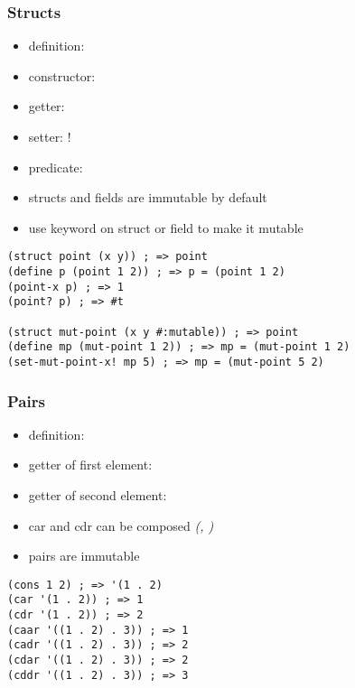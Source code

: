 \documentclass[a4paper,landscape,10pt]{article}
\begin{document}
\begin{multicols*}{2}
  \subsubsection{Structs}

  \begin{itemize}
    \item definition: 
    \item constructor: 
    \item getter: 
    \item setter: !
    \item predicate: 
    \item structs and fields are immutable by default
    \item use  keyword on struct or field to make it mutable
  \end{itemize}

  \begin{lstlisting}[language=Racket]
(struct point (x y)) ; => point
(define p (point 1 2)) ; => p = (point 1 2)
(point-x p) ; => 1
(point? p) ; => #t

(struct mut-point (x y #:mutable)) ; => point
(define mp (mut-point 1 2)) ; => mp = (mut-point 1 2)
(set-mut-point-x! mp 5) ; => mp = (mut-point 5 2)
\end{lstlisting}

  \subsubsection{Pairs}

  \begin{itemize}
    \item definition: 
    \item getter of first element: 
    \item getter of second element: 
    \item car and cdr can be composed \textit{(, )}
    \item pairs are immutable
  \end{itemize}

  \begin{lstlisting}[language=Racket, morekeywords={caar, cadr, cdar, cddr}]
(cons 1 2) ; => '(1 . 2)
(car '(1 . 2)) ; => 1
(cdr '(1 . 2)) ; => 2
(caar '((1 . 2) . 3)) ; => 1
(cadr '((1 . 2) . 3)) ; => 2
(cdar '((1 . 2) . 3)) ; => 2
(cddr '((1 . 2) . 3)) ; => 3
\end{lstlisting}


\end{multicols*}
\end{document}
